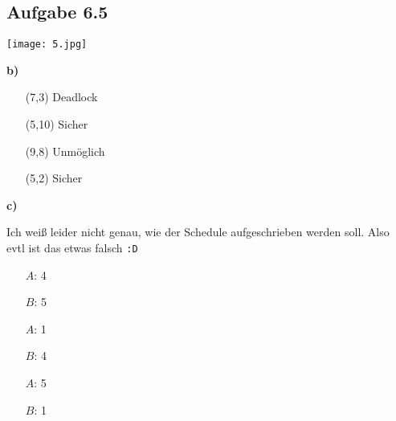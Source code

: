 \documentclass[a4paper,graphics,11pt]{article}
\newcommand{\aufgabe}[1]{\subsection*{Aufgabe #1}}
\begin{document}
\aufgabe{6.5}

\texttt{[image: 5.jpg]}

\textbf{b)}

\begin{itemize}
    \item[(7,3)] Deadlock
    \item[(5,10)] Sicher
    \item[(9,8)] Unmöglich
    \item[(5,2)] Sicher
\end{itemize}

\textbf{c)}

Ich weiß leider nicht genau, wie der Schedule aufgeschrieben werden soll. Also evtl ist das etwas falsch \texttt{:D}
\begin{itemize}
    \item[$A$:] 4
    \item[$B$:] 5
    \item[$A$:] 1
    \item[$B$:] 4
    \item[$A$:] 5
    \item[$B$:] 1
\end{itemize}
\end{document}
